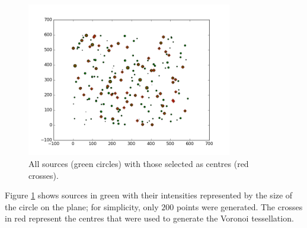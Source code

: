 \begin{figure}[H]
\centering
\includegraphics[width=0.8\textwidth]{Images/sources.png}
\caption{ All sources (green circles) with those selected as centres (red crosses).}
\label{fig:source}
\end{figure}
Figure \ref{fig:source} shows sources in green with their intensities represented by the size of the circle on the plane; for simplicity, only $200$ points were generated. The crosses in red represent the centres that were used to generate the Voronoi tessellation.
